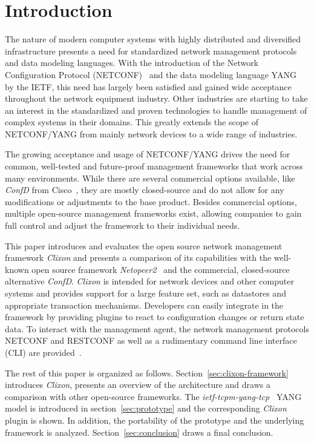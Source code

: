 \section{Introduction}
\label{sec:introduction}

The nature of modern computer systems with highly distributed and diversified infrastructure presents a need for standardized network management protocols and data modeling languages. With the introduction of the Network Configuration Protocol (NETCONF)~\cite{RFC6241} and the data modeling language YANG~\cite {RFC7950} by the IETF, this need has largely been satisfied and gained wide acceptance throughout the network equipment industry. Other industries are starting to take an interest in the standardized and proven technologies to handle management of complex systems in their domains. This greatly extends the scope of NETCONF/YANG from mainly network devices to a wide range of industries.

The growing acceptance and usage of NETCONF/YANG drives the need for common, well-tested and future-proof management frameworks that work across many environments. While there are several commercial options available, like \textit{ConfD} from Cisco~\cite{confd}, they are mostly closed-source and do not allow for any modifications or adjustments to the base product. Besides commercial options, multiple open-source management frameworks exist, allowing companies to gain full control and adjust the framework to their individual needs.

This paper introduces and evaluates the open source network management framework \textit{Clixon} and presents a comparison of its capabilities with the well-known open source framework \textit{Netopeer2}~\cite{netopeer2} and the commercial, closed-source alternative \textit{ConfD}. \textit{Clixon} is intended for network devices and other computer systems and provides support for a large feature set, such as datastores and appropriate transaction mechanisms. Developers can easily integrate in the framework by providing plugins to react to configuration changes or return state data. To interact with the management agent, the network management protocols NETCONF and RESTCONF as well as a rudimentary command line interface (CLI) are provided~\cite{clixon-documentation}.

The rest of this paper is organized as follows. Section~\ref{sec:clixon-framework} introduces \textit{Clixon}, presents an overview of the architecture and draws a comparison with other open-source frameworks. The \textit{ietf-tcpm-yang-tcp}~\cite{draft-ietf-tcpm-yang-tcp} YANG model is introduced in section~\ref{sec:prototype} and the corresponding \textit{Clixon} plugin is shown. In addition, the portability of the prototype and the underlying framework is analyzed. Section~\ref{sec:conclusion} draws a final conclusion.
